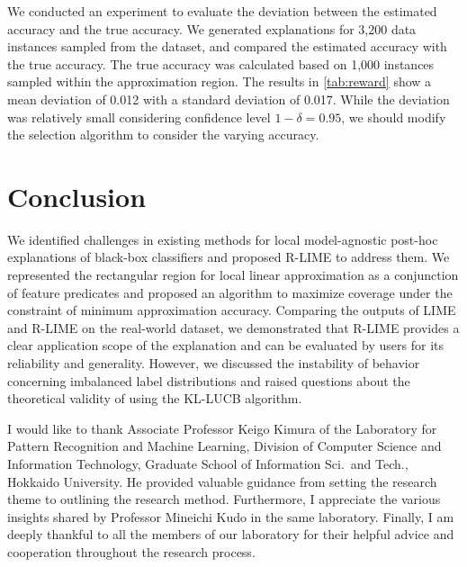 \documentclass[11pt]{article}
\begin{document}
We conducted an experiment to evaluate the deviation
between the estimated accuracy and the true accuracy.
We generated explanations for 3,200 data instances sampled from the dataset,
and compared the estimated accuracy with the true accuracy.
The true accuracy was calculated based on 1,000 instances sampled
within the approximation region.
The results in \cref{tab:reward} show a mean deviation of 0.012
with a standard deviation of 0.017.
While the deviation was relatively small considering confidence level $1-\delta=0.95$,
we should modify the selection algorithm to consider the varying accuracy.

\section{Conclusion}
We identified challenges in existing methods for local model-agnostic post-hoc
explanations of black-box classifiers and proposed R-LIME to address them.
We represented the rectangular region for local linear approximation as a
conjunction of feature predicates and proposed an algorithm to
maximize coverage under the constraint of minimum approximation accuracy.
Comparing the outputs of LIME and R-LIME on the real-world dataset,
we demonstrated that R-LIME provides a clear application scope of the
explanation and can be evaluated by users for its reliability and generality.
However, we discussed the instability of behavior concerning imbalanced label
distributions and raised questions about the theoretical validity of using
the KL-LUCB algorithm.

\ifnum{}
  \acknowledge
  I would like to thank Associate Professor Keigo Kimura
  of the Laboratory for Pattern Recognition and Machine Learning,
  Division of Computer Science and Information Technology,
  Graduate School of Information Sci.\ and Tech., Hokkaido University.
  He provided valuable guidance
  from setting the research theme to outlining the research method.
  Furthermore,
  I appreciate the various insights shared by Professor Mineichi Kudo
  in the same laboratory.
  Finally, I am deeply thankful to all the members of our laboratory
  for their helpful advice and cooperation throughout the research process.
\fi


%
%
%
\ifnum{}
  
\else
  
\fi

%
\end{document}
